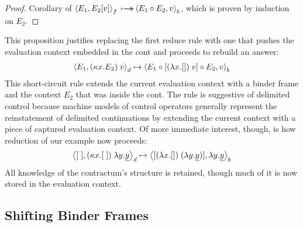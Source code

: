 \documentclass{LMCS}
\theoremstyle{plain}
\theoremstyle{remark}
\newcommand{\mapsTo}[0]{\mbox{\ensuremath{\makebox[0pt][l]{\hspace{7pt}$\rightarrow$}\longmapsto}}}
\renewcommand{\comp}[0]{\ensuremath{\circ}}
\newcommand{\refocus}[1]{\Braket{#1}_f}
\newcommand{\rebuild}[1]{\Braket{#1}_b}
\newcommand{\reduce}[1]{\Braket{#1}_d}
\begin{document}
\begin{proof}
  Corollary of $\refocus{E_1, E_2[v]} \mapsTo \rebuild{E_1\comp E_2,v}$,
  which is proven by induction on $E_2$. 
\end{proof}
This proposition justifies replacing the first reduce rule with one that pushes the evaluation context embedded
in the cont and proceeds to rebuild an answer:
\begin{gather*}
  \reduce{E_1, (\kappa x.E_2)\; v}
  \mapsto 
  \rebuild{E_1 \comp [(\lambda x.[])\; v] \comp E_2, v} 
\end{gather*}
This short-circuit rule extends the current evaluation context with a binder
frame and the context $E_2$ that was inside the cont.  The rule is suggestive
of delimited control because machine models of control operators generally
represent the reinstatement of delimited continuations by extending the current
context with a piece of captured evaluation context.  Of more immediate
interest, though, is how reduction of our example now proceeds:
\begin{gather*}
  \reduce{[\;], (\kappa x.[\;])\;\lambda y.\underline{y}} \mapsto
  \rebuild{[(\lambda x.[])\;(\lambda y.\underline{y})],\lambda y.\underline{y}} 
\end{gather*}
All knowledge of the contractum's structure is retained, though much of it is
now stored in the evaluation context.

\subsection{Shifting Binder Frames}
\end{document}
